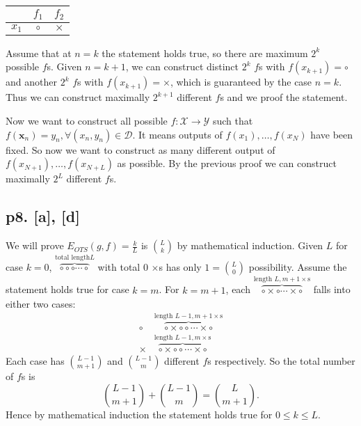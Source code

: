 \begin{table}[H]
\centering
\begin{tabular}{c|c|c}
        & $f_1$ & $f_2$\\
\hline
$x_1$   & $\circ$ & $\times$ 
\end{tabular}
\end{table}

Assume that at $n=k$ the statement holds true, so there are maximum $2^k$ possible $f$s. Given $n=k+1$, we can construct distinct $2^{k}$ $f$s with $f(x_{k+1}) = \circ$ and another $2^{k}$ $f$s with $f(x_{k+1}) = \times$, which is guaranteed by the case $n = k$. Thus we can construct maximally $2^{k+1}$ different $f$s and we proof the statement.

Now we want to construct all possible $f\colon\mathcal{X}\to\mathcal{Y}$ such that $f(\mathbf{x}_n) = y_n, \forall (x_n, y_n) \in \mathcal{D}$. It means outputs of $f(x_1), \dotsc, f(x_N)$ have been fixed. So now we want to construct as many different output of $f(x_{N+1}), \dotsc, f(x_{N+L})$ as possible. By the previous proof we can construct maximally $2^L$ different $f$s.

\subsection*{p8. [a], [d]}
We will prove  $E_{OTS}(g, f) = \frac{k}{L}$ is ${L \choose k}$ by mathematical induction. Given $L$ for case $k=0$, $\overbrace{\circ\circ\circ\dotsm\circ}^{\text{total length} L}$ with total 0 $\times$s has only $1 = {L \choose 0}$ possibility. Assume the statement holds true for case $k = m$. For $k = m+1$, each $\overbrace{\circ\times\circ\dotsm\times\circ}^{\text{length } L, m+1 \times\text{s}}$ falls into either two cases:
\begin{align*}
\circ&\overbrace{\circ\times\circ\circ\dotsm\times\circ}^{\text{length } L-1, m+1 \times\text{s}} \\
\times&\overbrace{\circ\times\circ\circ\dotsm\times\circ}^{\text{length } L-1, m \times\text{s}}
\end{align*}
Each case has ${L-1 \choose m+1}$ and ${L-1 \choose m}$ different $f$s respectively. So the total number of $f$s is
\[
{L-1 \choose m+1} + {L-1 \choose m} = {L \choose m+1}.
\]
Hence by mathematical induction the statement holds true for $0 \leq k \leq L$.

